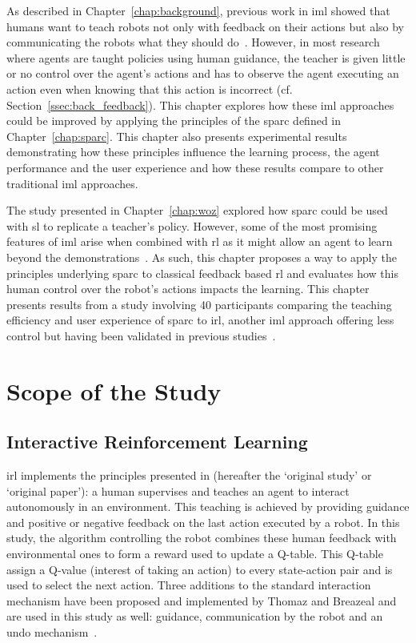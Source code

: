 As described in Chapter~\ref{chap:background}, previous work in \gls{iml} showed that humans want to teach robots not only with feedback on their actions but also by communicating the robots what they should do~\citep{thomaz2008teachable,amershi2014power}. However, in most research where agents are taught policies using human guidance, the teacher is given little or no control over the agent's actions and has to observe the agent executing an action even when knowing that this action is incorrect (cf. Section~\ref{ssec:back_feedback}). This chapter explores how these \gls{iml} approaches could be improved by applying the principles of the \gls{sparc} defined in Chapter~\ref{chap:sparc}. This chapter also presents experimental results demonstrating how these principles influence the learning process, the agent performance and the user experience and how these results compare to other traditional \gls{iml} approaches.

The study presented in Chapter~\ref{chap:woz} explored how \gls{sparc} could be used with \acrlong{sl} to replicate a teacher's policy. However, some of the most promising features of \gls{iml} arise when combined with \gls{rl} as it might allow an agent to learn beyond the demonstrations~\citep{abbeel2004apprenticeship}. As such, this chapter proposes a way to apply the principles underlying \gls{sparc} to classical feedback based \gls{rl} and evaluates how this human control over the robot's actions impacts the learning. This chapter presents results from a study involving 40 participants comparing the teaching efficiency and user experience of \gls{sparc} to \gls{irl}, another \gls{iml} approach offering less control but having been validated in previous studies~\citep{thomaz2008teachable}. 

\section{Scope of the Study}

\subsection{Interactive Reinforcement Learning}

\gls{irl} implements the principles presented in \cite{thomaz2008teachable} (hereafter the `original study' or `original paper'): a human supervises and teaches an agent to interact autonomously in an environment. This teaching is achieved by providing guidance and positive or negative feedback on the last action executed by a robot. In this study, the algorithm controlling the robot combines these human feedback with environmental ones to form a reward used to update a Q-table. This Q-table assign a Q-value (interest of taking an action) to every state-action pair and is used to select the next action. Three additions to the standard interaction mechanism have been proposed and implemented by Thomaz and Breazeal and are used in this study as well: guidance, communication by the robot and an undo mechanism~\citep{thomaz2008teachable}. 

